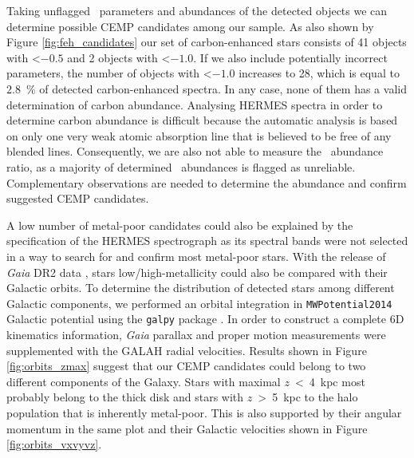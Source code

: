 Taking unflagged \TC\ parameters and abundances of the detected objects we can determine possible CEMP candidates among our sample. As also shown by Figure \ref{fig:feh_candidates} our set of carbon-enhanced stars consists of 41 objects with \Feh \textless $-0.5$ and 2 objects with \Feh \textless $-1.0$. If we also include potentially incorrect parameters, the number of objects with \Feh \textless $-1.0$ increases to 28, which is equal to $2.8$~\% of detected carbon-enhanced spectra. In any case, none of them has a valid determination of carbon abundance. Analysing HERMES spectra in order to determine carbon abundance is difficult because the automatic analysis is based on only one very weak atomic absorption line that is believed to be free of any blended lines. Consequently, we are also not able to measure the \CO\ abundance ratio, as a majority of determined \Cfe\ abundances is flagged as unreliable. Complementary observations are needed to determine the abundance and confirm suggested CEMP candidates.

A low number of metal-poor candidates could also be explained by the specification of the HERMES spectrograph as its spectral bands were not selected in a way to search for and confirm most metal-poor stars. With the release of {\it Gaia} DR2 data \citep{2018A&A...616A...1G}, stars low/high-metallicity could also be compared with their Galactic orbits. To determine the distribution of detected stars among different Galactic components, we performed an orbital integration in \texttt{MWPotential2014} Galactic potential using the \texttt{galpy} package \citep{2015ApJS..216...29B}. In order to construct a complete 6D kinematics information, {\it Gaia} parallax and proper motion measurements were supplemented with the GALAH radial velocities. Results shown in Figure \ref{fig:orbits_zmax} suggest that our CEMP candidates could belong to two different components of the Galaxy. Stars with maximal $z$~<~4~kpc most probably belong to the thick disk and stars with $z$~>~5~kpc to the halo population that is inherently metal-poor. This is also supported by their angular momentum in the same plot and their Galactic velocities shown in Figure \ref{fig:orbits_vxvyvz}.

